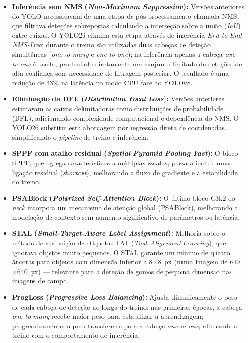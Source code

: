 \begin{itemize}
  \item \textbf{Inferência sem NMS (\textit{Non-Maximum Suppression}):}
    Versões anteriores do YOLO necessitavam de uma etapa de
    pós-processamento chamada NMS, que filtrava deteções sobrepostas
    calculando a interseção sobre a união (\textit{IoU}) entre caixas.
    O YOLO26 elimina esta etapa através de inferência \textit{End-to-End
    NMS-Free}: durante o treino são utilizadas duas cabeças de deteção
    simultâneas (\textit{one-to-many} e \textit{one-to-one}); na inferência
    apenas a cabeça \textit{one-to-one} é usada, produzindo diretamente um
    conjunto limitado de deteções de alta confiança sem necessidade de
    filtragem posterior. O resultado é uma redução de 43\% na latência no
    modo CPU face ao YOLOv8.

  \item \textbf{Eliminação da DFL (\textit{Distribution Focal Loss}):}
    Versões anteriores estimavam as caixas delimitadoras como distribuições
    de probabilidade (DFL), adicionando complexidade computacional e
    dependência do NMS. O YOLO26 substitui esta abordagem por regressão
    direta de coordenadas, simplificando o \textit{pipeline} de treino e
    inferência.

  \item \textbf{SPPF com atalho residual (\textit{Spatial Pyramid Pooling
    Fast}):} O bloco SPPF, que agrega características a múltiplas escalas,
    passa a incluir uma ligação residual (\textit{shortcut}), melhorando
    o fluxo de gradiente e a estabilidade do treino.

  \item \textbf{PSABlock (\textit{Polarized Self-Attention Block}):}
    O último bloco C3k2 do \textit{neck} incorpora um mecanismo de atenção
    global (PSABlock), melhorando a modelação de contexto sem aumento
    significativo de parâmetros ou latência.

  \item \textbf{STAL (\textit{Small-Target-Aware Label Assignment}):}
    Melhoria sobre o método de atribuição de etiquetas TAL
    (\textit{Task Alignment Learning}), que ignorava objetos muito pequenos.
    O STAL garante um mínimo de quatro âncoras para objetos com dimensão
    inferior a 8$\times$8~px (numa imagem de 640$\times$640~px) — relevante
    para a deteção de gomos de pequena dimensão nas imagens de campo.

  \item \textbf{ProgLoss (\textit{Progressive Loss Balancing}):}
    Ajusta dinamicamente o peso de cada cabeça de deteção ao longo do
    treino: nas primeiras épocas, a cabeça \textit{one-to-many} recebe
    maior peso para estabilizar a aprendizagem; progressivamente, o peso
    transfere-se para a cabeça \textit{one-to-one}, alinhando o treino com
    o comportamento de inferência.


\end{itemize}
